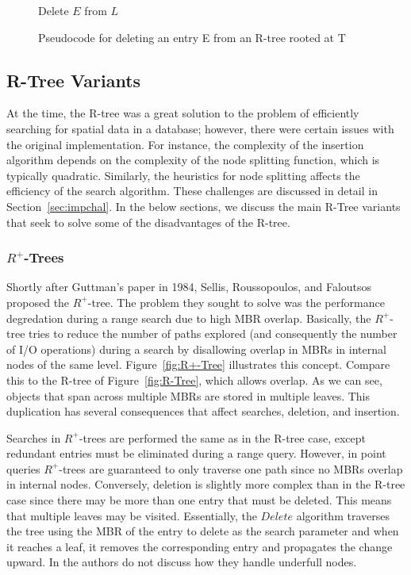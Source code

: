 \begin{figure}[t]
\begin{algorithmic}
	\State {}
	\State Delete $E$ from $L$
	\State {}
\EndFunction
\end{algorithmic}
\caption{Pseudocode for deleting an entry E from an R-tree rooted at T}
\label{fig:R_Tree_Delete}
\end{figure}

\subsection{R-Tree Variants}
\label{sec:variants}
At the time, the R-tree  was a great solution to the problem of efficiently searching
for spatial data in a database; however, there were certain issues with the original
implementation. For instance, the complexity of the insertion algorithm
depends on the complexity of the node splitting function, which is typically
quadratic. Similarly, the heuristics for node splitting affects the efficiency of 
the search algorithm. These challenges are discussed in detail in 
Section~\ref{sec:impchal}. In the below sections, we discuss the main R-Tree
variants that seek to solve some of the disadvantages of the R-tree.

\subsubsection{$R^{+}$-Trees}
Shortly after Guttman's paper in 1984, Sellis, Roussopoulos, and Faloutsos proposed 
the $R^{+}$-tree. The problem they sought to solve was the performance degredation 
during a range search due to high MBR overlap. Basically, the $R^{+}$-tree tries to 
reduce the number of paths explored (and consequently the number of I/O operations) 
during a search by disallowing overlap in MBRs in internal nodes of the same level. 
Figure~\ref{fig:R+-Tree} illustrates this concept. Compare this to the R-tree of 
Figure~\ref{fig:R-Tree}, which allows overlap. As we can see, objects that span 
across multiple MBRs are stored in multiple leaves. This duplication has several 
consequences that affect searches, deletion, and insertion.

Searches in $R^{+}$-trees are performed the same as in the R-tree case, except
redundant entries must be eliminated during a range query. However, in point queries
$R^{+}$-trees are guaranteed to only traverse one path since no MBRs overlap in 
internal nodes. Conversely, deletion is slightly more complex than in the R-tree case
since there may be more than one entry that must be deleted. This means that multiple 
leaves may be visited. Essentially, the $Delete$ algorithm traverses the tree using
the MBR of the entry to delete as the search parameter and when it reaches a leaf, it 
removes the corresponding entry and propagates the change upward. In \cite{SellisRoussopoulosFaloutsos86} the authors do not discuss how they handle underfull nodes.


